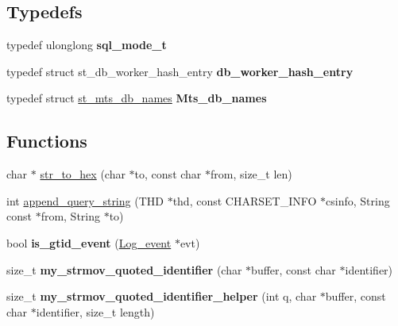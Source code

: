 \subsection*{Typedefs}
\begin{DoxyCompactItemize}
\item 
\mbox{\label{group__Replication_ga1dba8b6567061f45e6b9df70480b5239}} 
typedef ulonglong {\bfseries sql\+\_\+mode\+\_\+t}
\item 
\mbox{\label{group__Replication_ga76fbb8f3fab041f32919a5c9b779efee}} 
typedef struct st\+\_\+db\+\_\+worker\+\_\+hash\+\_\+entry {\bfseries db\+\_\+worker\+\_\+hash\+\_\+entry}
\item 
\mbox{\label{group__Replication_ga984f4e44849152cfcf0f66accc964e65}} 
typedef struct \mbox{\hyperlink{structst__mts__db__names}{st\+\_\+mts\+\_\+db\+\_\+names}} {\bfseries Mts\+\_\+db\+\_\+names}
\end{DoxyCompactItemize}
\subsection*{Functions}
\begin{DoxyCompactItemize}
\item 
char $\ast$ \mbox{\hyperlink{group__Replication_gabd3a9658816041b32f7da3a121650668}{str\+\_\+to\+\_\+hex}} (char $\ast$to, const char $\ast$from, size\+\_\+t len)
\item 
int \mbox{\hyperlink{group__Replication_ga634d01455adb6c184a8832558d9af0c2}{append\+\_\+query\+\_\+string}} (T\+HD $\ast$thd, const C\+H\+A\+R\+S\+E\+T\+\_\+\+I\+N\+FO $\ast$csinfo, String const $\ast$from, String $\ast$to)
\item 
\mbox{\label{group__Replication_gae17acd0611b51110006f27f1d79de7ad}} 
bool {\bfseries is\+\_\+gtid\+\_\+event} (\mbox{\hyperlink{classLog__event}{Log\+\_\+event}} $\ast$evt)
\item 
\mbox{\label{group__Replication_ga1331fc0a6eeea8f04b725636f893cfd5}} 
size\+\_\+t {\bfseries my\+\_\+strmov\+\_\+quoted\+\_\+identifier} (char $\ast$buffer, const char $\ast$identifier)
\item 
\mbox{\label{group__Replication_gaa69cb2ec819d49474f3f21a529f0f327}} 
size\+\_\+t {\bfseries my\+\_\+strmov\+\_\+quoted\+\_\+identifier\+\_\+helper} (int q, char $\ast$buffer, const char $\ast$identifier, size\+\_\+t length)
\end{DoxyCompactItemize}
